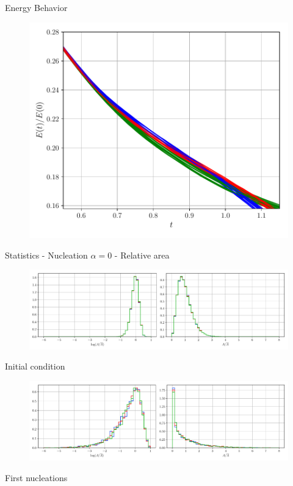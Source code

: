 \documentclass[usenames,dvipsnames]{beamer}
\begin{document}
\begin{frame}{Energy Behavior}
\begin{minipage}{0.5\textwidth}
\begin{figure}
    \includegraphics[scale=0.4]{figures/stored_energy/SE_energy_zoom.pdf}
\end{figure}
\end{minipage}
\end{frame}

\begin{frame}{Statistics - Nucleation $\alpha = 0$ - Relative area}
\small
\centering
    \vspace{-0.5em}
    \begin{figure}
        \centering
        \includegraphics[scale=0.35]{figures/stored_energy/SE/areas/000000_nuclconstant_set.pdf}
    \end{figure}
    \vspace{-1em}
    Initial condition
    \begin{figure}
        \centering
        \includegraphics[scale=0.35]{figures/stored_energy/SE/areas/000070_nuclconstant_set.pdf}
    \end{figure}
    \vspace{-1em}
    First nucleations
\end{frame}
\end{document}
